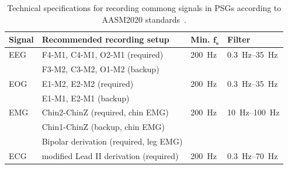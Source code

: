             \begin{table}[tb]
                \small
                \centering
                \caption[Technical specifications for recording \acs{PSG} signals]{Technical specifications for recording commong signals in \acsp{PSG} according to \acs{AASM}2020 standards~\cite{Berry2020}.}%
                \label{tab:aasm_recordings}
            \begin{threeparttable}
                \begin{tabular}{@{}llll@{}} \toprule
                    \textbf{Signal} & \textbf{Recommended recording setup} & \textbf{Min.} \(\mathbf{f_s}\) & \textbf{Filter} \\ \midrule
                    EEG & F4-M1, C4-M1, O2-M1 (required)    & \SI{200}{\hertz}  & \SIrange[range-units=single,range-phrase=--]{0.3}{35}{\hertz} \\
                        & F3-M2, C3-M2, O1-M2 (backup)      &                   &                                                               \\
                    EOG & E1-M2, E2-M2 (required)   & \SI{200}{\hertz}  & \SIrange[range-units=single,range-phrase=--]{0.3}{35}{\hertz} \\
                        & E1-M1, E2-M1 (backup)     &                   &                                                               \\
                    EMG & Chin2-ChinZ (required, chin EMG)  & \SI{200}{\hertz}  & \SIrange[range-units=single,range-phrase=--]{10}{100}{\hertz} \\
                        & Chin1-ChinZ (backup, chin EMG)    &                   &                                                               \\
                        & Bipolar derivation (required, leg EMG) & &                                            \\
                    ECG & modified Lead II derivation (required) & \SI{200}{\hertz} & \SIrange[range-units=single,range-phrase=--]{0.3}{70}{\hertz} \\ \bottomrule

\end{tabular}
\end{threeparttable}
\end{table}
